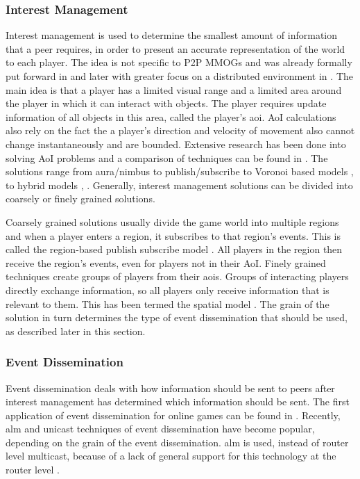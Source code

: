 \documentclass[journal,oneside,a4paper,onecolumn]{IEEEtran}
\begin{document}
\subsubsection{Interest Management}
Interest management is used to determine the smallest amount of information that a peer requires, in order to present an accurate representation of the world to each player. The idea is not specific to P2P MMOGs and was already formally put forward in \cite{First_IM} and later with greater focus on a distributed environment in \cite{Whang_agent_based_IM}. The main idea is that a player has a limited visual range and a limited area around the player in which it can interact with objects. The player requires update information of all objects in this area, called the player's \ac{aoi}. AoI calculations also rely on the fact the a player's direction and velocity of movement also cannot change instantaneously and are bounded. Extensive research has been done into solving AoI problems and a comparison of techniques can be found in \cite{Boulanger_IM_compare}. The solutions range from aura/nimbus \cite{Benford_spatial_IM} to publish/subscribe \cite{zoned_federation} to Voronoi based models \cite{Hu_voronoi_IM}, \cite{Buyukkaya_voronoi_state_management} to hybrid models \cite{hybrid_IM}, \cite{MOPAR}. Generally, interest management solutions can be divided into coarsely or finely grained solutions.

Coarsely grained solutions usually divide the game world into multiple regions and when a player enters a region, it subscribes to that region's events. This is called the region-based publish subscribe model \cite{Fan_deisgn_issues_p2p}. All players in the region then receive the region's events, even for players not in their AoI. Finely grained techniques create groups of players from their \acp{aoi}. Groups of interacting players directly exchange information, so all players only receive information that is relevant to them. This has been termed the spatial model \cite{Fan_deisgn_issues_p2p}. The grain of the solution in turn determines the type of event dissemination that should be used, as described later in this section.

\subsubsection{Event Dissemination}
Event dissemination deals with how information should be sent to peers after interest management has determined which information should be sent. The first application of event dissemination for online games can be found in \cite{first_GED}. Recently, \ac{alm} and unicast techniques of event dissemination have become popular, depending on the grain of the event dissemination. \ac{alm} is used, instead of router level multicast, because of a lack of general support for this technology at the router level \cite{ip_multicast_deployment_issues}.
\end{document}
